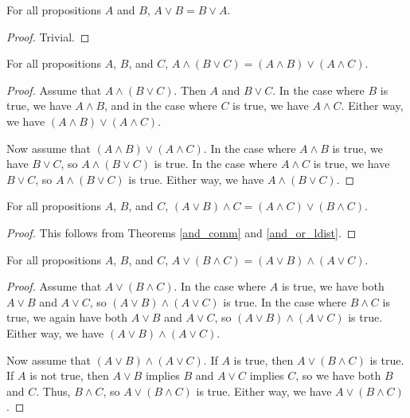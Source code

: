 \documentclass[../../math.tex]{subfiles}
\begin{document}
\begin{theorem} \label{or_comm}
    For all propositions $A$ and $B$, $A \vee B = B \vee A$.
\end{theorem}
\begin{proof}
    Trivial.
\end{proof}

\begin{theorem} \label{and_or_ldist}
    For all propositions $A$, $B$, and $C$, $A \wedge (B \vee C) = (A \wedge B)
    \vee (A \wedge C)$.
\end{theorem}
\begin{proof}
    Assume that $A \wedge (B \vee C)$.  Then $A$ and $B \vee C$.  In the case
    where $B$ is true, we have $A \wedge B$, and in the case where $C$ is true,
    we have $A \wedge C$.  Either way, we have $(A \wedge B) \vee (A \wedge C)$.

    Now assume that $(A \wedge B) \vee (A \wedge C)$.  In the case where $A
    \wedge B$ is true, we have $B \vee C$, so $A \wedge (B \vee C)$ is true.  In
    the case where $A \wedge C$ is true, we have $B \vee C$, so $A \wedge (B
    \vee C)$ is true.  Either way, we have $A \wedge (B \vee C)$.
\end{proof}

\begin{theorem} \label{and_or_rdist}
    For all propositions $A$, $B$, and $C$, $(A \vee B) \wedge C = (A \wedge C)
    \vee (B \wedge C)$.
\end{theorem}
\begin{proof}
    This follows from Theorems \ref{and_comm} and \ref{and_or_ldist}.
\end{proof}

\begin{theorem} \label{or_and_ldist}
    For all propositions $A$, $B$, and $C$, $A \vee (B \wedge C) = (A \vee B)
    \wedge (A \vee C)$.
\end{theorem}
\begin{proof}
    Assume that $A \vee (B \wedge C)$.  In the case where $A$ is true, we have
    both $A \vee B$ and $A \vee C$, so $(A \vee B) \wedge (A \vee C)$ is true.
    In the case where $B \wedge C$ is true, we again have both $A \vee B$ and $A
    \vee C$, so $(A \vee B) \wedge (A \vee C)$ is true.  Either way, we have $(A
    \vee B) \wedge (A \vee C)$.

    Now assume that $(A \vee B) \wedge (A \vee C)$.  If $A$ is true, then $A
    \vee (B \wedge C)$ is true.  If $A$ is not true, then $A \vee B$ implies
    $B$ and $A \vee C$ implies $C$, so we have both $B$ and $C$.  Thus, $B
    \wedge C$, so $A \vee (B \wedge C)$ is true.  Either way, we have $A \vee (B
    \wedge C)$.
\end{proof}
\end{document}
